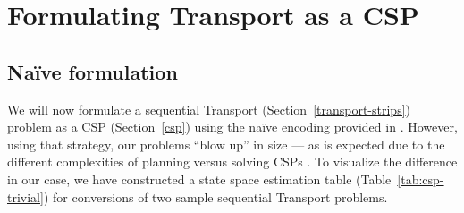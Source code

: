 















\section{Formulating Transport as a CSP}\label{csp-formulation}


\subsection{Na{\"{i}}ve formulation}

We will now formulate a sequential Transport (Section~\ref{transport-strips}) problem as a CSP (Section~\ref{csp}) using the na{\"{i}}ve encoding provided in \citet[Section~8.3]{Ghallab2004}.
However, using that strategy, our problems ``blow up'' in size --- as is expected due
to the different complexities of planning versus solving CSPs \citep[Section~8.3.2]{Ghallab2004}. To visualize the difference in our case, we have constructed a state space estimation table (Table~\ref{tab:csp-trivial}) for conversions of two sample sequential Transport problems.

